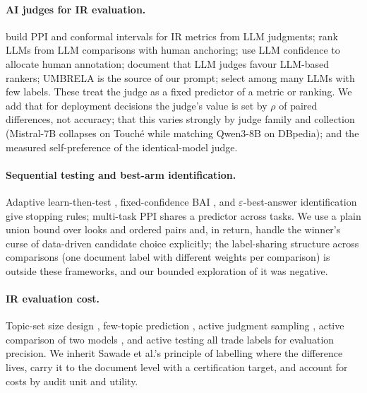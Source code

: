 \documentclass{article}
\newcommand{\eps}{\varepsilon}
\begin{document}
\paragraph{AI judges for IR evaluation.} \citet{oosterhuis2024reliable} build PPI and conformal intervals for IR metrics from LLM judgments; \citet{chatzi2024ppr} rank LLMs from LLM comparisons with human anchoring; \citet{gligoric2024unconfident} use LLM confidence to allocate human annotation; \citet{balog2025rankers} document that LLM judges favour LLM-based rankers; UMBRELA \citep{upadhyay2024umbrela} is the source of our prompt; \citet{durmazkeser2026selection} select among many LLMs with few labels. These treat the judge as a fixed predictor of a metric or ranking. We add that for deployment decisions the judge's value is set by $\rho$ of paired differences, not accuracy; that this varies strongly by judge family and collection (Mistral-7B collapses on Touch\'e while matching Qwen3-8B on DBpedia); and the measured self-preference of the identical-model judge.
\paragraph{Sequential testing and best-arm identification.} Adaptive learn-then-test \citep{zecchin2024altt}, fixed-confidence BAI \citep{jamieson2014best,kaufmann2016complexity}, and $\eps$-best-answer identification \citep{jourdan2022choosing} give stopping rules; multi-task PPI \citep{emmenegger2026multitask} shares a predictor across tasks. We use a plain union bound over looks and ordered pairs and, in return, handle the winner's curse of data-driven candidate choice explicitly; the label-sharing structure across comparisons (one document label with different weights per comparison) is outside these frameworks, and our bounded exploration of it was negative.
\paragraph{IR evaluation cost.} Topic-set size design \citep{sakai2016topic}, few-topic prediction \citep{guiver2009few}, active judgment sampling \citep{li2017active}, active comparison of two models \citep{sawade2012active}, and active testing \citep{kossen2021active} all trade labels for evaluation precision. We inherit Sawade et al.'s principle of labelling where the difference lives, carry it to the document level with a certification target, and account for costs by audit unit and utility.
\end{document}
